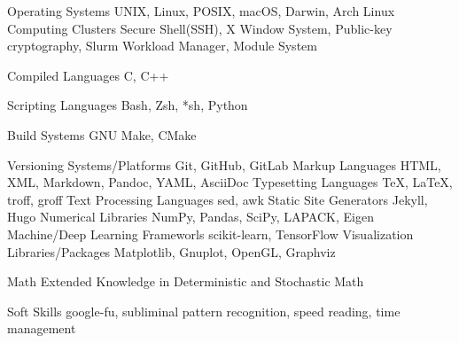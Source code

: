 

\begin{cvskills}

  \cvskill
    {Operating Systems} %
    {UNIX, Linux, POSIX, macOS, Darwin, Arch Linux} %
  \cvskill
    {Computing Clusters} %
    {Secure Shell(SSH), X Window System, Public-key cryptography, Slurm Workload Manager, Module System} %

  \cvskill
    {Compiled Languages} %
    {C, C++} %

  \cvskill
    {Scripting Languages} %
    {Bash, Zsh, *sh, Python} %

  \cvskill
    {Build Systems} %
    {GNU Make, CMake} %

  \cvskill
    {Versioning Systems/Platforms} %
    {Git, GitHub, GitLab} %
  \cvskill
    {Markup Languages} %
    {HTML, XML, Markdown, Pandoc, YAML, AsciiDoc}
  \cvskill
    {Typesetting Languages} %
    {TeX, LaTeX, troff, groff}
  \cvskill
    {Text Processing Languages} %
    {sed, awk}
  \cvskill
    {Static Site Generators} %
    {Jekyll, Hugo} %
  \cvskill
    {Numerical Libraries} %
    {NumPy, Pandas, SciPy, LAPACK, Eigen} %
  \cvskill
    {Machine/Deep Learning Frameworls} %
    {scikit-learn, TensorFlow} %
  \cvskill
    {Visualization Libraries/Packages} %
    {Matplotlib, Gnuplot, OpenGL, Graphviz} %

  \cvskill
    {Math} %
    {Extended Knowledge in Deterministic and Stochastic Math} %

    
  \cvskill
    {Soft Skills} %
    {google-fu, subliminal pattern recognition, speed reading, time management} %
\end{cvskills}

